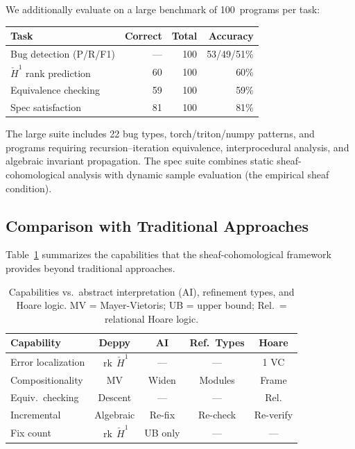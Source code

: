 \documentclass[acmsmall,screen,review,anonymous]{acmart}
\theoremstyle{remark}
\newcommand{\Hc}[1]{\check{H}^{#1}}
\newcommand{\rk}{\operatorname{rk}}
\begin{document}
We additionally evaluate on a large benchmark of 100~programs per task:

\begin{center}\small
\begin{tabular}{lrrr}
\toprule
\textbf{Task} & \textbf{Correct} & \textbf{Total} & \textbf{Accuracy} \\
\midrule
Bug detection (P/R/F1) & --- & 100 & 53/49/51\% \\
$\Hc{1}$ rank prediction & 60 & 100 & 60\% \\
Equivalence checking     & 59 & 100 & 59\% \\
Spec satisfaction        & 81 & 100 & 81\% \\
\bottomrule
\end{tabular}
\end{center}

The large suite includes 22 bug types, torch/triton/numpy patterns,
and programs requiring recursion--iteration equivalence,
interprocedural analysis, and algebraic invariant propagation.
The spec suite combines static sheaf-cohomological analysis with
dynamic sample evaluation (the empirical sheaf condition).

\subsection{Comparison with Traditional Approaches}

Table~\ref{tab:comparison} summarizes the capabilities that the
sheaf-cohomological framework provides beyond traditional approaches.

\begin{table}[t]
\centering\small
\begin{tabular}{lcccc}
\toprule
\textbf{Capability} & \textbf{Deppy} & \textbf{AI} & \textbf{Ref.\ Types} & \textbf{Hoare} \\
\midrule
Error localization & $\rk\,\Hc{1}$ & --- & --- & 1 VC \\
Compositionality & MV & Widen & Modules & Frame \\
Equiv.\ checking & Descent & --- & --- & Rel. \\
Incremental & Algebraic & Re-fix & Re-check & Re-verify \\
Fix count & $\rk\,\Hc{1}$ & UB only & --- & --- \\
\bottomrule
\end{tabular}
\caption{Capabilities vs.\ abstract interpretation (AI), refinement
types, and Hoare logic.  MV = Mayer-Vietoris; UB = upper bound;
Rel.\ = relational Hoare logic.}
\label{tab:comparison}
\end{table}
\end{document}
